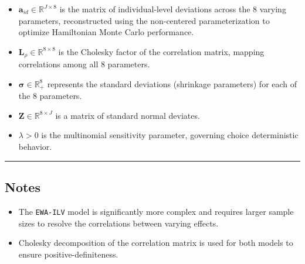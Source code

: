 \documentclass[
  letterpaper,
  DIV=11,
  numbers=noendperiod]{scrartcl}
\providecommand{\tightlist}{%
  \setlength{\itemsep}{0pt}\setlength{\parskip}{0pt}}\usepackage{longtable,booktabs,array}
\begin{document}
\begin{itemize}
  alters their attraction updating and social learning weight.
\item
  \(\mathbf{a}_{id} \in \mathbb{R}^{J \times 8}\) is the matrix of
  individual-level deviations across the 8 varying parameters,
  reconstructed using the non-centered parameterization to optimize
  Hamiltonian Monte Carlo performance.
\item
  \(\mathbf{L}_{\rho} \in \mathbb{R}^{8 \times 8}\) is the Cholesky
  factor of the correlation matrix, mapping correlations among all 8
  parameters.
\item
  \(\boldsymbol{\sigma} \in \mathbb{R}^8_+\) represents the standard
  deviations (shrinkage parameters) for each of the 8 parameters.
\item
  \(\mathbf{Z} \in \mathbb{R}^{8 \times J}\) is a matrix of standard
  normal deviates.
\item
  \(\lambda > 0\) is the multinomial sensitivity parameter, governing
  choice deterministic behavior.
\end{itemize}

\begin{center}\rule{0.5\linewidth}{0.5pt}\end{center}

\subsection{Notes}\label{notes}

\begin{tcolorbox}[enhanced jigsaw, colback=white, toprule=.15mm, coltitle=black, colframe=quarto-callout-note-color-frame, breakable, opacityback=0, bottomrule=.15mm, leftrule=.75mm, opacitybacktitle=0.6, colbacktitle=quarto-callout-note-color!10!white, title=\textcolor{quarto-callout-note-color}{\faInfo}\hspace{0.5em}{Note}, left=2mm, bottomtitle=1mm, toptitle=1mm, titlerule=0mm, arc=.35mm, rightrule=.15mm]

\begin{itemize}
\tightlist
\item
  The \texttt{EWA-ILV} model is significantly more complex and requires
  larger sample sizes to resolve the correlations between varying
  effects.
\item
  Cholesky decomposition of the correlation matrix is used for both
  models to ensure positive-definiteness.
\end{itemize}

\end{tcolorbox}
\end{document}
